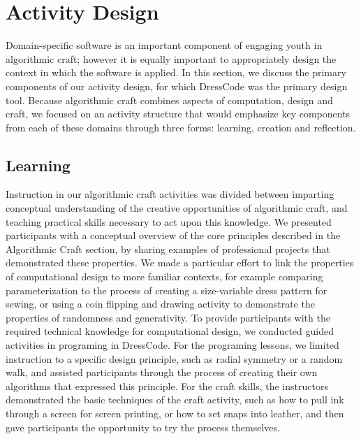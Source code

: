 \documentclass{sigchi}
\begin{document}
\section{Activity Design}
Domain-specific software is an important component of engaging youth in algorithmic craft; however it is equally important to appropriately design the context in which the software is applied. In this section, we discuss the primary components of our activity design, for which DressCode was the primary design tool. 
Because algorithmic craft combines aspects of computation, design and craft, we focused on an activity structure that would emphasize key components from each of these domains through three forms: learning, creation and reflection. 

\subsection{Learning}
Instruction in our algorithmic craft activities was divided between imparting conceptual understanding of the creative opportunities of algorithmic craft, and teaching practical skills necessary to act upon this knowledge. We presented participants with a conceptual overview of the core principles described in the Algorithmic Craft section, by sharing examples of professional projects that demonstrated these properties. We made a particular effort to link the properties of computational design to more familiar contexts, for example comparing parameterization to the process of creating a size-variable dress pattern for sewing, or using a coin flipping and drawing activity to demonstrate the properties of randomness and generativity.  To provide participants with the required technical knowledge for computational design, we conducted guided activities in programing in DressCode. For the programing lessons, we limited instruction to a specific design principle, such as radial symmetry or a random walk, and assisted participants through the process of creating their own algorithms that expressed this principle. For the craft skills, the instructors demonstrated the basic techniques of the craft activity, such as how to pull ink through a screen for screen printing, or how to set snaps into leather, and then gave participants the opportunity to try the process themselves.
\end{document}
